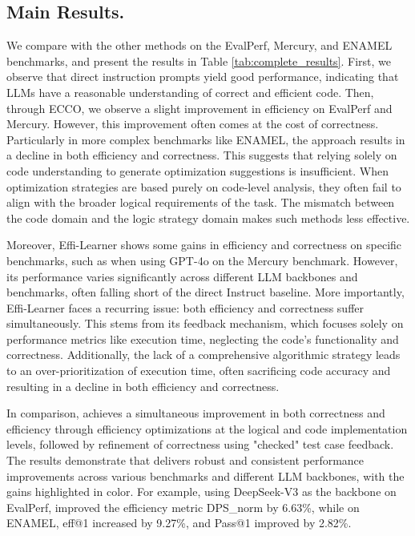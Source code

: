 

\subsection{Main Results.}
We compare \tool with the other methods on the EvalPerf, Mercury, and ENAMEL benchmarks, and present the results in Table \ref{tab:complete_results}. First, we observe that direct instruction prompts yield good performance, indicating that LLMs have a reasonable understanding of correct and efficient code.  Then, through ECCO, we observe a slight improvement in efficiency on EvalPerf and Mercury. However, this improvement often comes at the cost of correctness. Particularly in more complex benchmarks like ENAMEL, the approach results in a decline in both efficiency and correctness. This suggests that relying solely on code understanding to generate optimization suggestions is insufficient. When optimization strategies are based purely on code-level analysis, they often fail to align with the broader logical requirements of the task. The mismatch between the code domain and the logic strategy domain makes such methods less effective.

Moreover, Effi-Learner shows some gains in efficiency and correctness on specific benchmarks, such as when using GPT-4o on the Mercury benchmark. However, its performance varies significantly across different LLM backbones and benchmarks, often falling short of the direct Instruct baseline. More importantly, Effi-Learner faces a recurring issue: both efficiency and correctness suffer simultaneously. This stems from its feedback mechanism, which focuses solely on performance metrics like execution time, neglecting the code’s functionality and correctness. Additionally, the lack of a comprehensive algorithmic strategy leads to an over-prioritization of execution time, often sacrificing code accuracy and resulting in a decline in both efficiency and correctness.

In comparison, \tool achieves a simultaneous improvement in both correctness and efficiency through efficiency optimizations at the logical and code implementation levels, followed by refinement of correctness using "checked" test case feedback. The results demonstrate that \tool delivers robust and consistent performance improvements across various benchmarks and different LLM backbones, with the gains highlighted in color. For example, using DeepSeek-V3 as the backbone on EvalPerf, \tool improved the efficiency metric DPS\_norm by 6.63\%, while on ENAMEL, eff@1 increased by 9.27\%, and Pass@1 improved by 2.82\%.

